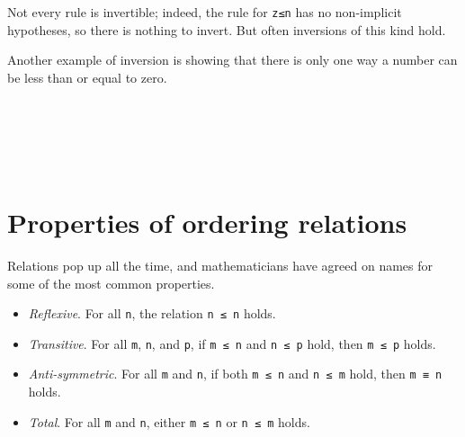 Not every rule is invertible; indeed, the rule for \texttt{z≤n} has no
non-implicit hypotheses, so there is nothing to invert. But often
inversions of this kind hold.

Another example of inversion is showing that there is only one way a
number can be less than or equal to zero.

\begin{fence}
\begin{code}%
\>[0]\AgdaSpace{}%
\AgdaSymbol{:}\AgdaSpace{}%
\AgdaSpace{}%
\AgdaSymbol{\{}\AgdaSpace{}%
\AgdaSymbol{:}\AgdaSpace{}%
\AgdaSymbol{\}}\<%
\\
\>[0][@{}l@{\AgdaIndent{0}}]%
\>[2]%
\>[149I]\AgdaSpace{}%
\AgdaSpace{}%
\<%
\\
\>[.][@{}l@{}]\<[149I]%
\>[4]\AgdaComment{--------}\<%
\\
%
\>[2]\AgdaSpace{}%
\AgdaSpace{}%
\AgdaSpace{}%
\<%
\\
\>[0]\AgdaSpace{}%
\AgdaSpace{}%
\AgdaSymbol{=}\AgdaSpace{}%
\<%
\end{code}
\end{fence}

\hypertarget{properties-of-ordering-relations}{%
\section{Properties of ordering
relations}\label{properties-of-ordering-relations}}

Relations pop up all the time, and mathematicians have agreed on names
for some of the most common properties.

\begin{itemize}
\tightlist
\item
  \emph{Reflexive}. For all \texttt{n}, the relation \texttt{n\ ≤\ n}
  holds.
\item
  \emph{Transitive}. For all \texttt{m}, \texttt{n}, and \texttt{p}, if
  \texttt{m\ ≤\ n} and \texttt{n\ ≤\ p} hold, then \texttt{m\ ≤\ p}
  holds.
\item
  \emph{Anti-symmetric}. For all \texttt{m} and \texttt{n}, if both
  \texttt{m\ ≤\ n} and \texttt{n\ ≤\ m} hold, then \texttt{m\ ≡\ n}
  holds.
\item
  \emph{Total}. For all \texttt{m} and \texttt{n}, either
  \texttt{m\ ≤\ n} or \texttt{n\ ≤\ m} holds.
\end{itemize}

